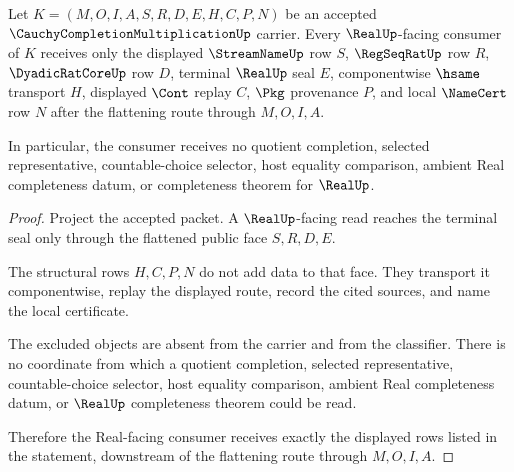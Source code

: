 \begin{theorem}
\label{thm:cauchy-completion-multiplication-real-seal-nonescape}
Let $K=(M,O,I,A,S,R,D,E,H,C,P,N)$ be an accepted $\CauchyCompletionMultiplicationUp$ carrier. Every $\RealUp$-facing consumer of $K$ receives only the displayed $\StreamNameUp$ row $S$, $\RegSeqRatUp$ row $R$, $\DyadicRatCoreUp$ row $D$, terminal $\RealUp$ seal $E$, componentwise $\hsame$ transport $H$, displayed $\Cont$ replay $C$, $\Pkg$ provenance $P$, and local $\NameCert$ row $N$ after the flattening route through $M,O,I,A$.

In particular, the consumer receives no quotient completion, selected representative, countable-choice selector, host equality comparison, ambient Real completeness datum, or completeness theorem for $\RealUp$.
\end{theorem}
\begin{proof}
Project the accepted packet. A $\RealUp$-facing read reaches the terminal seal only through the flattened public face $S,R,D,E$.

The structural rows $H,C,P,N$ do not add data to that face. They transport it componentwise, replay the displayed route, record the cited sources, and name the local certificate.

The excluded objects are absent from the carrier and from the classifier. There is no coordinate from which a quotient completion, selected representative, countable-choice selector, host equality comparison, ambient Real completeness datum, or $\RealUp$ completeness theorem could be read.

Therefore the Real-facing consumer receives exactly the displayed rows listed in the statement, downstream of the flattening route through $M,O,I,A$.
\end{proof}

